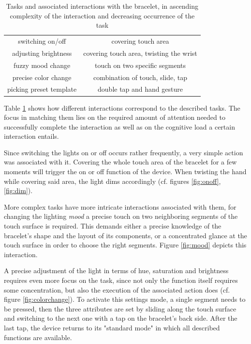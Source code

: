 \begin{table}
	\myfloatalign
	\begin{tabularx}{.95\textwidth}{cc}
		\toprule
		\tableheadline{Task} & \tableheadline{Associated Interaction}\\ 
		\midrule
		switching on/off & covering touch area\\
		adjusting brightness & covering touch area, twisting the wrist\\
		fuzzy mood change & touch on two specific segments\\
		precise color change & combination of touch, slide, tap\\
		picking preset template & double tap and hand gesture\\
		\bottomrule
	\end{tabularx}
	\caption[Tasks and associated interactions with the bracelet]{Tasks and associated interactions with the bracelet, in ascending complexity of the interaction and decreasing occurrence of the task}  \label{tab:interaction}
\end{table}

Table \ref{tab:interaction} shows how different interactions correspond to the described tasks. The focus in matching them lies on the required amount of attention needed to successfully complete the interaction as well as on the cognitive load a certain interaction entails. 

Since switching the lights on or off occurs rather frequently, a very simple action was associated with it. Covering the whole touch area of the bracelet for a few moments will trigger the on or off function of the device. When twisting the hand while covering said area, the light dims accordingly (cf. figures \ref{fig:onoff}, \ref{fig:dim}). 

More complex tasks have more intricate interactions associated with them, for changing the lighting \textit{mood} a precise touch on two neighboring segments of the touch surface is required. This demands either a precise knowledge of the bracelet's shape and the layout of its components, or a concentrated glance at the touch surface in order to choose the right segments. Figure \ref{fig:mood} depicts this interaction.

A precise adjustment of the light in terms of hue, saturation and brightness requires even more focus on the task, since not only the function itself requires some concentration, but also the execution of the associated action does (cf. figure \ref{fig:colorchange}). To activate this settings mode, a single segment needs to be pressed, then the three attributes are set by sliding along the touch surface and switching to the next one with a tap on the bracelet's back side. After the last tap, the device returns to its "standard mode" in which all described functions are available.

